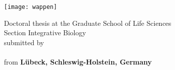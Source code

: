 \documentclass[
12pt, %
english, %
doublespacing, %
headsepline, %
chapterinoneline, %
]{MastersDoctoralThesis} %
\author{Jan Alexander \textsc{Freudenthal}} %
\begin{document}
 
\frontmatter %

\pagestyle{plain} 


\begin{titlepage}
  \begin{center}
    {\scshape\LARGE
       \univname\par}\vspace{1.0cm}
    \texttt{[image: wappen]}
    \vspace{1.0cm}
    
    {\color{mdtRed}\Large \bfseries \ttitle\par}
    \vspace{1.0cm}
    
    Doctoral thesis at the Graduate School of Life Sciences \\
    Section Integrative Biology \\
    submitted by \\
    \vspace{1.0cm}
    \color{mdtRed}{{\LARGE\emph{\authorname}}} \\
    \vspace{1.0cm}
    \color{black}from
    \textbf{L\"{u}beck, Schleswig-Holstein, Germany}
    
    

 



\end{center}
\end{titlepage}
\end{document}
